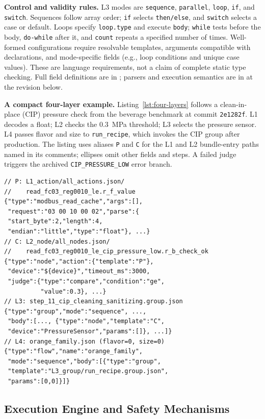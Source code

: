 \documentclass[conference]{IEEEtran}
\begin{document}
\textbf{Control and validity rules.} L3 modes are \texttt{sequence}, \texttt{parallel}, \texttt{loop}, \texttt{if}, and \texttt{switch}. Sequences follow array order; \texttt{if} selects \texttt{then/else}, and \texttt{switch} selects a case or default. Loops specify \texttt{loop.type} and execute \texttt{body}; \texttt{while} tests before the body, \texttt{do-while} after it, and \texttt{count} repeats a specified number of times. Well-formed configurations require resolvable templates, arguments compatible with declarations, and mode-specific fields (e.g., loop conditions and unique case values). These are language requirements, not a claim of complete static type checking. Full field definitions are in ; parsers and execution semantics are in  at the revision below.

\textbf{A compact four-layer example.} Listing~\ref{lst:four-layers} follows a clean-in-place (CIP) pressure check from the beverage benchmark at commit \texttt{2e1282f}. L1 decodes a float; L2 checks the 0.3~MPa threshold; L3 selects the pressure sensor. L4 passes flavor and size to \texttt{run\_recipe}, which invokes the CIP group after production. The listing uses aliases \texttt{P} and \texttt{C} for the L1 and L2 bundle-entry paths named in its comments; ellipses omit other fields and steps. A failed judge triggers the archived \texttt{CIP\_PRESSURE\_LOW} error branch.

\begin{lstlisting}[caption={CIP pressure check across L1--L4 (selected fields).},label={lst:four-layers},captionpos=t]
// P: L1_action/all_actions.json/
//    read_fc03_reg0010_le.r_f_value
{"type":"modbus_read_cache","args":[],
 "request":"03 00 10 00 02","parse":{
 "start_byte":2,"length":4,
 "endian":"little","type":"float"}, ...}
// C: L2_node/all_nodes.json/
//    read_fc03_reg0010_le_cip_pressure_low.r_b_check_ok
{"type":"node","action":{"template":"P"},
 "device":"${device}","timeout_ms":3000,
 "judge":{"type":"compare","condition":"ge",
          "value":0.3}, ...}
// L3: step_11_cip_cleaning_sanitizing.group.json
{"type":"group","mode":"sequence", ...,
 "body":[..., {"type":"node","template":"C",
 "device":"PressureSensor","params":[]}, ...]}
// L4: orange_family.json (flavor=0, size=0)
{"type":"flow","name":"orange_family",
 "mode":"sequence","body":[{"type":"group",
 "template":"L3_group/run_recipe.group.json",
 "params":[0,0]}]}
\end{lstlisting}

\subsection{Execution Engine and Safety Mechanisms}
\end{document}
